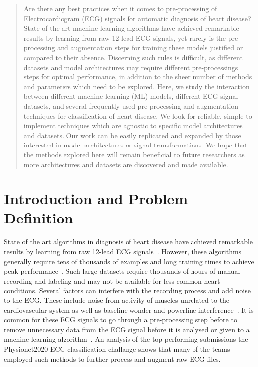 \documentclass{article}
\begin{document}
\begin{abstract}
Are there any best practices when it comes to pre-processing of Electrocardiogram (ECG) signals for automatic diagnosis of heart disease? 
State of the art machine learning algorithms have achieved remarkable results by learning from raw 12-lead ECG signals, yet rarely is the pre-processing and augmentation steps for training these models justified or compared to their absence. Discerning such rules is difficult, as different datasets and model architectures may require different pre-processings steps for optimal performance, in addition to the sheer number of methods and parameters which need to be explored. Here, we study the interaction between different machine learning (ML) models, different ECG signal datasets, and several frequently used pre-processing and augmentation techniques for classification of heart disease. We look for reliable, simple to implement techniques which are agnostic to specific model architectures and datasets. Our work can be easily replicated and expanded by those interested in model architectures or signal transformations. We hope that the methods explored here will remain beneficial to future researchers as more architectures and datasets are discovered and made available. 


\end{abstract} \hspace{12pt}
\section{Introduction and Problem Definition} 
State of the art algorithms in diagnosis of heart disease have achieved remarkable results by learning from raw 12-lead ECG signals~\cite{reyna2021will,reyna4issues}. However, these algorithms generally require tens of thousands of examples and long training times to achieve peak performance~\cite{reyna2021will,reyna4issues,natarajan2020wide}. Such large datasets require thousands of hours of manual recording and labeling and may not be available for less common heart conditions. Several factors can interfere with the recording process and add noise to the ECG. These include noise from activity of muscles unrelated to the cardiovascular system as well as baseline wonder and powerline interference~\cite{sornmo2006electrocardiogram}. It is common for these ECG signals to go through a pre-processing step before to remove unnecessary data from the ECG signal before it is analysed or given to a machine learning algorithm~\cite{gacek2011ecg,sornmo2006electrocardiogram}. An analysis of the top performing submissions the Physionet2020 ECG classification challange shows that many of the teams employed such methods to further process and augment raw ECG files. \\
\end{document}
